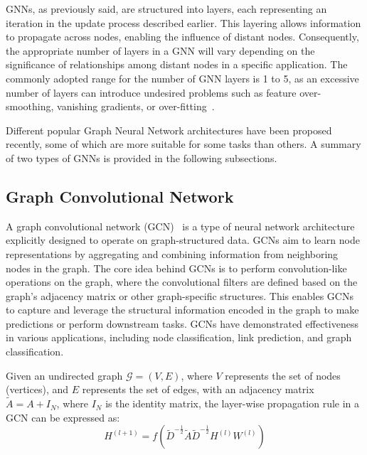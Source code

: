 GNNs, as previously said, are structured into layers, each representing an iteration in the update process described earlier.
This layering allows information to propagate across nodes, enabling the influence of distant nodes.
Consequently, the appropriate number of layers in a GNN will vary depending on the significance of relationships among distant nodes in a specific application.
The commonly adopted range for the number of GNN layers is 1 to 5, as an excessive number of layers can introduce undesired problems such as feature over-smoothing, vanishing gradients, or over-fitting~\cite{DBLP:journals/corr/abs-1801-07606}.

Different popular Graph Neural Network architectures have been proposed recently, some of which are more suitable for some tasks than others.
A summary of two types of GNNs is provided in the following subsections.

\subsection{Graph Convolutional Network}
\label{subsec:graph_convolutional_network}%

A graph convolutional network (GCN)~\cite{DBLP:journals/corr/KipfW16, daigavane2021understanding} is a type of neural network architecture explicitly designed to operate on graph-structured data.
GCNs aim to learn node representations by aggregating and combining information from neighboring nodes in the graph.
The core idea behind GCNs is to perform convolution-like operations on the graph, where the convolutional filters are defined based on the graph's adjacency matrix or other graph-specific structures.
This enables GCNs to capture and leverage the structural information encoded in the graph to make predictions or perform downstream tasks.
GCNs have demonstrated effectiveness in various applications, including node classification, link prediction, and graph classification.

Given an undirected graph $\mathcal{G} = (V, E)$, where $V$ represents the set of nodes (vertices), and $E$ represents the set of edges, with an adjacency matrix $\tilde{A}=A+I_N$, where $I_N$ is the identity matrix, the layer-wise propagation rule in a GCN can be expressed as:
\begin{equation}
    \label{eq:gcn_convolution}
    H^{(l+1)} = f \left( \tilde{D}^{-\tfrac{1}{2}}  \tilde{A}  \tilde{D}^{-\tfrac{1}{2}}  H^{(l)}  W^{(l)} \right)
\end{equation}

